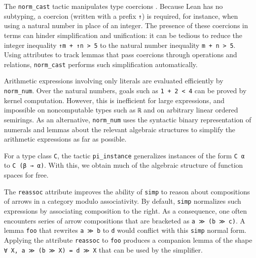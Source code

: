 \documentclass[sigplan]{acmart}\settopmatter{}
\begin{document}
The \lstinline{norm_cast} tactic manipulates
type coercions \cite{Made19}. Because Lean has no subtyping, a coercion
(written with a prefix \lstinline{↑})
is required, for instance, when using a
natural number in place of an integer. The presence of these coercions in terms can
hinder simplification and unification:
it can be tedious to reduce the integer inequality \lstinline{↑m + ↑n > 5}
to the natural number inequality \lstinline{m + n > 5}.
Using attributes to track lemmas that pass coercions through operations and relations,
\lstinline{norm_cast} performs such simplification automatically.

Arithmetic expressions involving only literals
are evaluated efficiently by \lstinline{norm_num}.
Over the natural numbers,
goals such as \lstinline{1 + 2 < 4}
can be proved by kernel computation.
However, this is inefficient for large expressions,
and impossible on noncomputable types such as \lstinline{ℝ}
and on arbitrary linear ordered semirings.
As an alternative,
\lstinline{norm_num} uses the syntactic binary representation of numerals
and lemmas about the relevant algebraic structures
to simplify the arithmetic expressions as far as possible.



For a type class \lstinline{C},
the tactic \lstinline{pi_instance} generalizes instances of the form
\lstinline{C α} to \lstinline{C (β → α)}.
With this, we obtain much of the algebraic structure of function spaces for free.

The \lstinline{reassoc} attribute improves the ability of \lstinline{simp} to
reason about compositions of arrows in a category modulo associativity.
By default, \lstinline{simp} normalizes
such expressions by associating composition to the right. As a
consequence, one often encounters series of arrow compositions that
are bracketed as \lstinline{a ≫ (b ≫ c)}.
A lemma \lstinline{foo}
that rewrites \lstinline{a ≫ b} to \lstinline{d}
would conflict with this \lstinline{simp} normal form.
Applying the attribute \lstinline{reassoc} to \lstinline{foo}
produces a companion lemma
of the shape \lstinline{∀ X, a ≫ (b ≫ X) = d ≫ X}
that can be used by the simplifier.
\end{document}
